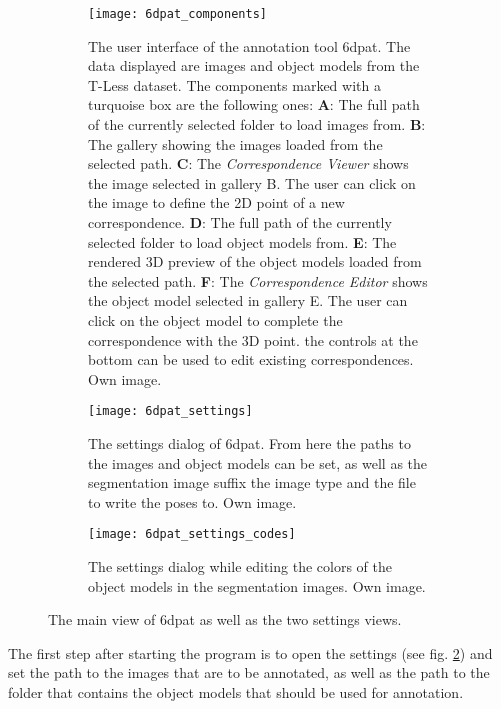 \begin{figure}[!tbp]
	\centering
	\begin{subfigure}[t]{\textwidth}
		\centering
    	\texttt{[image: 6dpat\_components]}
    	\caption{The user interface of the annotation tool \gls{6dpat}. The data displayed are images and object models from the T-Less dataset. The components marked with a turquoise box are the following ones: \textbf{A}: The full path of the currently selected folder to load images from. \textbf{B}: The gallery showing the images loaded from the selected path. \textbf{C}: The \textit{Correspondence Viewer} shows the image selected in gallery B. The user can click on the image to define the 2D point of a new correspondence. \textbf{D}: The full path of the currently selected folder to load object models from. \textbf{E}: The rendered 3D preview of the object models loaded from the selected path. \textbf{F}: The \textit{Correspondence Editor} shows the object model selected in gallery E. The user can click on the object model to complete the correspondence with the 3D point. the controls at the bottom can be used to edit existing correspondences. Own image.}
    	\label{fig:6dpat_components}
	\end{subfigure}
	\par\bigskip
	\begin{subfigure}[t]{0.47\textwidth}
		\centering
    	\texttt{[image: 6dpat\_settings]}
    	\caption{The settings dialog of \gls{6dpat}. From here the paths to the images and object models can be set, as well as the segmentation image suffix the image type and the file to write the poses to. Own image.}
    	\label{fig:6dpat_settings}
	\end{subfigure}
	\hfill
	\begin{subfigure}[t]{0.47\textwidth}
	\centering
    	\texttt{[image: 6dpat\_settings\_codes]}
    	\caption{The settings dialog while editing the colors of the object models in the segmentation images. Own image.}
    	\label{fig:6dpat_settings_codes}
	\end{subfigure}
	\caption{The main view of \gls{6dpat} as well as the two settings views.}
	\label{fig:6dpat_ui_overview}
\end{figure}

The first step after starting the program is to open the settings (see fig. \ref{fig:6dpat_settings}) and set the path to the images that are to be annotated, as well as the path to the folder that contains the object models that should be used for annotation. 

